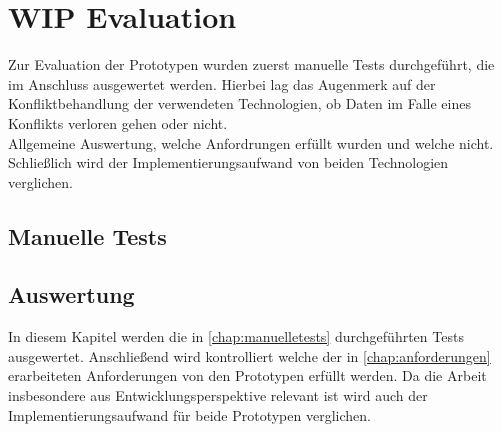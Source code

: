 \chapter{\label{chap:evaluation}WIP Evaluation}
Zur Evaluation der Prototypen wurden zuerst manuelle Tests durchgeführt, die im Anschluss ausgewertet werden. 
Hierbei lag das Augenmerk auf der Konfliktbehandlung der verwendeten Technologien, ob Daten im Falle eines Konflikts verloren gehen oder nicht.\\
Allgemeine Auswertung, welche Anfordrungen erfüllt wurden und welche nicht.
Schließlich wird der Implementierungsaufwand von beiden Technologien verglichen.
%
%
\section{\label{chap:manuelletests}Manuelle Tests}

%
%
\section{\label{chap:auswertung}Auswertung}
In diesem Kapitel werden die in \autoref{chap:manuelletests} durchgeführten Tests ausgewertet.
Anschließend wird kontrolliert welche der in \autoref{chap:anforderungen} erarbeiteten Anforderungen von den Prototypen erfüllt werden.
Da die Arbeit insbesondere aus Entwicklungsperspektive relevant ist wird auch der Implementierungsaufwand für beide Prototypen verglichen.
